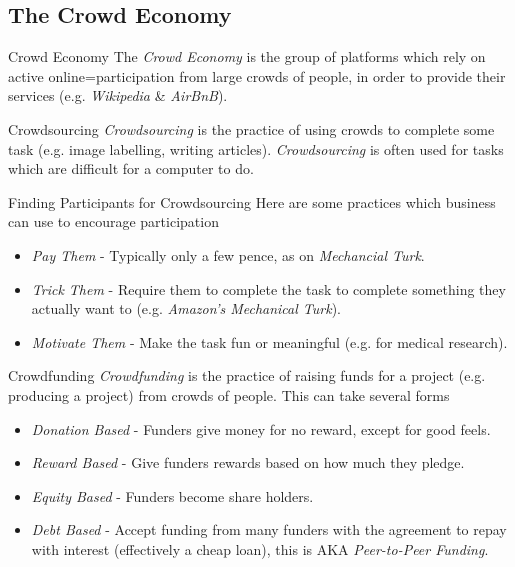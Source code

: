 \documentclass[11pt,a4paper]{article}
\begin{document}
\subsection{The Crowd Economy} \label{sec_TheCrowdEconomy}

  \begin{definition}{Crowd Economy}
    The \textit{Crowd Economy} is the group of platforms which rely on active online=participation from large crowds of people, in order to provide their services (e.g. \textit{Wikipedia} \& \textit{AirBnB}).
  \end{definition}

  \begin{definition}{Crowdsourcing}
    \textit{Crowdsourcing} is the practice of using crowds to complete some task (e.g. image labelling, writing articles). \textit{Crowdsourcing} is often used for tasks which are difficult for a computer to do.
  \end{definition}

  \begin{proposition}{Finding Participants for Crowdsourcing}
    Here are some practices which business can use to encourage participation
    \begin{itemize}
      \item \textit{Pay Them} - Typically only a few pence, as on \textit{Mechancial Turk}.
      \item \textit{Trick Them} - Require them to complete the task to complete something they actually want to (e.g. \textit{Amazon's Mechanical Turk}).
      \item \textit{Motivate Them} - Make the task fun or meaningful (e.g. for medical research).
    \end{itemize}
  \end{proposition}

  \begin{definition}{Crowdfunding}
    \textit{Crowdfunding} is the practice of raising funds for a project (e.g. producing a project) from crowds of people. This can take several forms
    \begin{itemize}
      \item \textit{Donation Based} - Funders give money for no reward, except for good feels.
      \item \textit{Reward Based} - Give funders rewards based on how much they pledge.
      \item \textit{Equity Based} - Funders become share holders.
      \item \textit{Debt Based} - Accept funding from many funders with the agreement to repay with interest (effectively a cheap loan), this is AKA \textit{Peer-to-Peer Funding}.
    \end{itemize}
  \end{definition}
\end{document}
